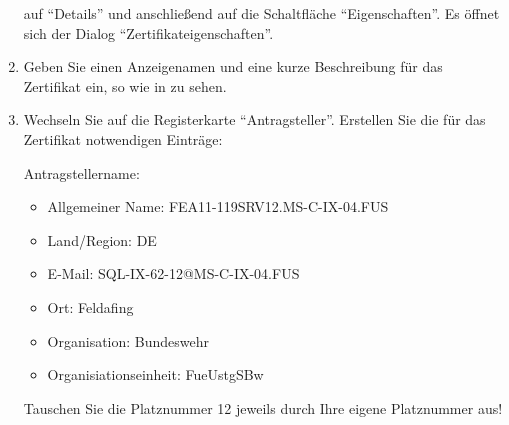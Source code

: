 \begin{enumerate}
            auf \enquote{Details} und anschließend auf die
            Schaltfläche \enquote{Eigenschaften}. Es öffnet sich der Dialog
            \enquote{Zertifikateigenschaften}.
            \item Geben Sie einen Anzeigenamen und eine kurze Beschreibung für
            das Zertifikat ein, so wie in  zu sehen.
            \item Wechseln Sie auf die Registerkarte \enquote{Antragsteller}.
            Erstellen Sie die für das Zertifikat notwendigen Einträge:
              
            Antragstellername:
            \begin{itemize}
              \item Allgemeiner Name: FEA11-119SRV12.MS-C-IX-04.FUS
              \item Land/Region: DE
              \item E-Mail: SQL-IX-62-12@MS-C-IX-04.FUS
              \item Ort: Feldafing
              \item Organisation: Bundeswehr
              \item Organisiationseinheit: FueUstgSBw
            \end{itemize}
            \begin{merke}
              Tauschen Sie die Platznummer 12 jeweils durch Ihre eigene
              Platznummer aus!
            \end{merke}
            

\end{enumerate}
